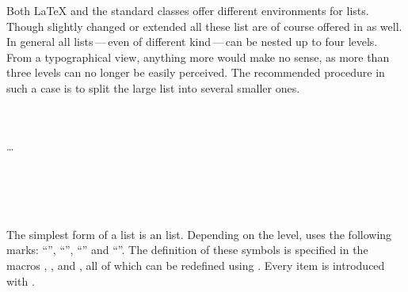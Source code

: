 Both {\LaTeX} and the standard classes offer different environments for
lists. Though slightly changed or extended all these list are of course
offered in {\KOMAScript} as well. In general all lists\,---\,even of different
kind\,---\,can be nested up to four levels. From a typographical view,
anything more would make no sense, as more than three levels can no longer be
easily perceived. The recommended procedure in such a case is
to split the large list into several smaller ones.


\ifCommonscrextend\else
\begin{Declaration}
  \\
  \quad{}\\
  \quad\dots\\
  \\
  \\
  \\
  \\
\end{Declaration}%
%
%
%
%
%
%
The simplest form of a list is an  list.
\iffalse %
The users of a certain disliked word processing package often refer to
this form of a list as \emph{bulletpoints}.  Presumably, these users
are unable to envisage that, depending on the level, a different
symbol from a large dot could be used to introduce each
point. %
\fi%
Depending on the level, {\KOMAScript} uses the following marks:
``{}'', ``{}'', ``{}'' and
``{}''. The definition of these symbols is specified in
the macros , ,
 and , all of which can be
redefined using . Every item is introduced with
.%
%
\ifCommonmaincls
